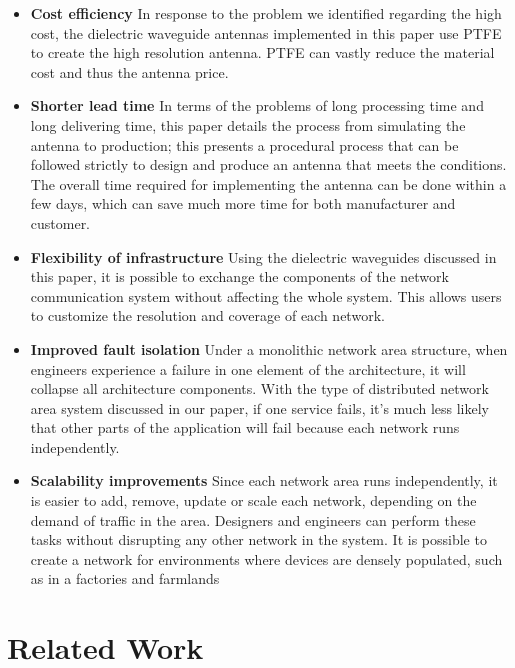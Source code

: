 \documentclass[a4paper,12pt]{report}
\begin{document}
\begin{itemize}
  \item[] \textbf{Cost efficiency}
  In response to the problem we identified regarding the high cost,
  the dielectric waveguide antennas implemented in this paper use PTFE
  to create the high resolution antenna.
  PTFE can vastly reduce the material cost and thus the antenna price.

  \item[] \textbf{Shorter lead time}
  In terms of the problems of long processing time and long
  delivering time, this paper details the process
  from simulating the antenna to production;
  this presents a
  procedural process that can be followed strictly to design and produce
  an antenna that meets the conditions. The overall time
  required for implementing the antenna can be done within a few days,
  which can
  save much more time for both manufacturer and customer.

  \item[] \textbf{Flexibility of infrastructure}
  Using the dielectric waveguides discussed in this paper,
  it is possible to exchange the components of the
  network communication system without affecting the whole system.
  This allows users to customize the resolution and coverage
  of each network.

  \item[] \textbf{Improved fault isolation}
  Under a monolithic network area structure,
  when engineers experience a failure in one element of the architecture,
  it will collapse all architecture components.
  With the type of distributed network area system discussed in our paper,
  if one service fails,
  it's much less likely that other parts of the application
  will fail because each network runs independently.

  \item[] \textbf{Scalability improvements}
  Since each network area runs independently,
  it is easier to add, remove, update or scale each network,
  depending on the demand of traffic in the area.
  Designers and engineers can perform these tasks without disrupting any other
  network in the system.
  It is possible to create a network for environments where
  devices are densely populated,
  such as in a factories and farmlands
\end{itemize}

\section{Related Work}
\end{document}
